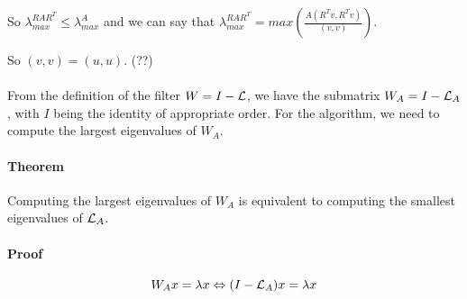 So \(\lambda_{max}^{RAR^T} \le \lambda^A_{max}\) and we can say that \(\lambda_{max}^{RAR^T} = max(\frac{A (R^T v, R^T v)}{(v, v)})\).

So \((v, v) = (u, u)\). (??)

\paragraph{}
From the definition of the filter \(W = I - \operatorname{\mathcal{L}}\), we have the submatrix \(W_A = I - \operatorname{\mathcal{L}}_A\), with \(I\) being the identity of appropriate order.
For the algorithm, we need to compute the largest eigenvalues of \(W_A\).

\paragraph{Theorem}
Computing the largest eigenvalues of \(W_A\) is equivalent to computing the smallest eigenvalues of \(\operatorname{\mathcal{L}}_A\).

\paragraph{Proof}

\[W_A x = \lambda x \Leftrightarrow (I - \operatorname{\mathcal{L}}_A)x = \lambda x \]
